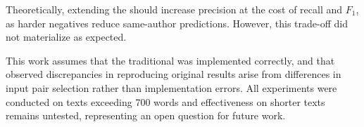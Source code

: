 Theoretically, extending the \impAppr{} should increase precision at the cost of recall and $F_1$, as harder negatives reduce same-author predictions. 
However, this trade-off did not materialize as expected.

This work assumes that the traditional \impAppr{} was implemented correctly, and that observed discrepancies in reproducing original results arise from differences in input pair selection rather than implementation errors. 
All experiments were conducted on texts exceeding 700 words and effectiveness on shorter texts remains untested, representing an open question for future work.
